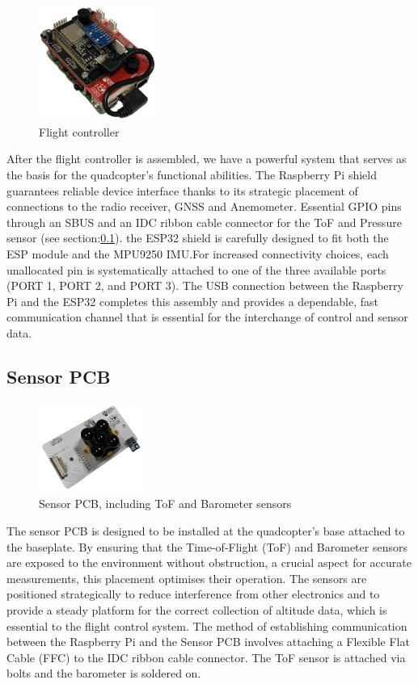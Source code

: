 \documentclass{report}
\begin{document}
\begin{figure}[H]
  \centering
  \includegraphics[width=0.35\textwidth]{Pictures/flight_controller.png}
  \caption{Flight controller}
  \label{fig:flightController2}
\end{figure}
After the flight controller is assembled, we have a powerful system that serves
as the basis for the quadcopter's functional abilities. The Raspberry Pi shield
guarantees reliable device interface thanks to its strategic placement of
connections to the radio receiver, GNSS and Anemometer. Essential GPIO pins
through an SBUS and an IDC ribbon cable connector for the ToF and Pressure
sensor (see section:\ref{sensorpcb}). the ESP32 shield is carefully  designed to
fit both the ESP module and the MPU9250 IMU.For increased connectivity choices,
each unallocated pin is systematically attached to one of the three available
ports (PORT 1, PORT 2, and PORT 3). The USB connection between the Raspberry Pi
and the ESP32 completes this assembly and provides a dependable, fast
communication channel that is essential for the interchange of control and
sensor data.

\subsection{Sensor PCB}\label{sensorpcb}
\begin{figure}[H]
  \centering
  \includegraphics[width=0.3\textwidth]{Pictures/sensorpcb.png}
  \caption{Sensor PCB, including ToF and Barometer sensors}
  \label{fig:sensorpcb}
\end{figure}
The sensor PCB is designed to be installed at the quadcopter's base attached to
the baseplate. By ensuring that the Time-of-Flight (ToF) and Barometer sensors
are exposed to the environment without obstruction, a crucial aspect for
accurate measurements, this placement optimises their operation. The sensors are
positioned strategically to reduce interference from other electronics and to
provide a steady platform for the correct collection of altitude data, which is
essential to the flight control system. The method of establishing communication
between the Raspberry Pi and the Sensor PCB involves attaching a Flexible Flat
Cable (FFC) to the IDC ribbon cable connector. The ToF sensor is attached via
bolts and the barometer is soldered on.
\end{document}
